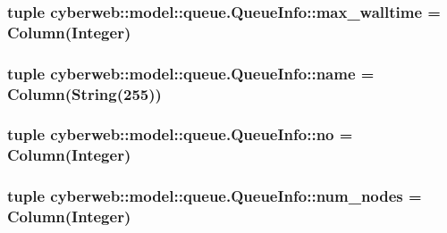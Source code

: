 \hypertarget{classcyberweb_1_1model_1_1queue_1_1_queue_info_a339dbe8ab205ed17246570e82b8ed26c}{
\subsubsection[{max\-\_\-walltime}]{\setlength{\rightskip}{0pt plus 5cm}tuple {\bf cyberweb\-::model\-::queue.\-Queue\-Info\-::max\-\_\-walltime} = \-Column(\-Integer)}}\label{classcyberweb_1_1model_1_1queue_1_1_queue_info_a339dbe8ab205ed17246570e82b8ed26c}
\hypertarget{classcyberweb_1_1model_1_1queue_1_1_queue_info_ae69b46ad81e2651e7cc95105c95981de}{
\subsubsection[{name}]{\setlength{\rightskip}{0pt plus 5cm}tuple {\bf cyberweb\-::model\-::queue.\-Queue\-Info\-::name} = \-Column(\-String(255))}}\label{classcyberweb_1_1model_1_1queue_1_1_queue_info_ae69b46ad81e2651e7cc95105c95981de}
\hypertarget{classcyberweb_1_1model_1_1queue_1_1_queue_info_ae44897a17998300506cda4cf8a62ad0b}{
\subsubsection[{no}]{\setlength{\rightskip}{0pt plus 5cm}tuple {\bf cyberweb\-::model\-::queue.\-Queue\-Info\-::no} = \-Column(\-Integer)}}\label{classcyberweb_1_1model_1_1queue_1_1_queue_info_ae44897a17998300506cda4cf8a62ad0b}
\hypertarget{classcyberweb_1_1model_1_1queue_1_1_queue_info_a0a96cf642f277feb810fc1b75e0ed222}{
\subsubsection[{num\-\_\-nodes}]{\setlength{\rightskip}{0pt plus 5cm}tuple {\bf cyberweb\-::model\-::queue.\-Queue\-Info\-::num\-\_\-nodes} = \-Column(\-Integer)}}\label{classcyberweb_1_1model_1_1queue_1_1_queue_info_a0a96cf642f277feb810fc1b75e0ed222}
